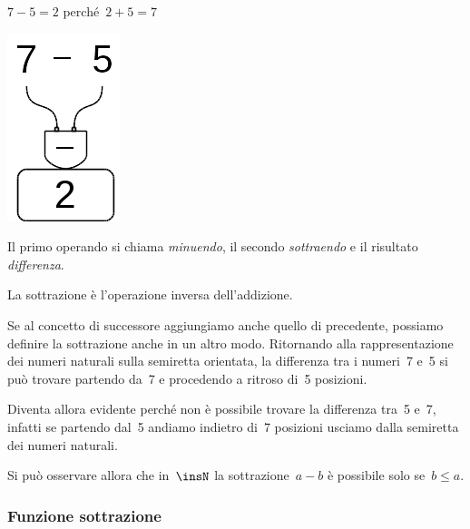 \begin{minipage}{0.80\textwidth}
 \centering
 \(7-5=2\) perché~\(2+5=7\)

 
\end{minipage}%
\begin{minipage}{0.15\textwidth}
 \centering
\begin{inaccessibleblock}
 \includegraphics[scale=0.35]{img/op_sot.png}
\end{inaccessibleblock}
\end{minipage}%

Il primo operando si chiama \emph{minuendo}, il secondo \emph{sottraendo} e 
il risultato \emph{differenza}.

La sottrazione è l'operazione inversa dell'addizione.

Se al concetto di successore aggiungiamo anche quello di precedente, 
possiamo definire la sottrazione anche in un altro modo.
Ritornando alla rappresentazione dei numeri naturali sulla semiretta 
orientata, la differenza tra i numeri~7 e~5 si può trovare partendo da~7 e 
procedendo a ritroso di~5 posizioni.

Diventa allora evidente perché non è possibile trovare la differenza 
tra~5 e~7, infatti se partendo dal~5 andiamo indietro di~7 posizioni 
usciamo dalla semiretta dei numeri naturali.

\begin{inaccessibleblock}

\end{inaccessibleblock}

Si può osservare allora che in~\(\insN\) la sottrazione~\(a - b\) è possibile 
solo se~\(b\leq a\).

\subsubsection{Funzione sottrazione}

